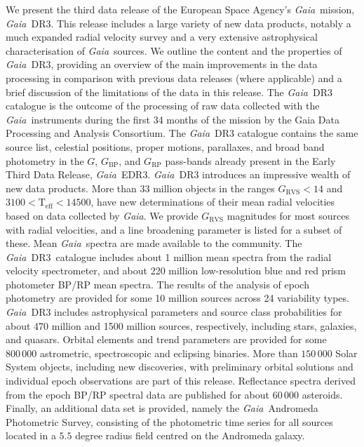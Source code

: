 \documentclass[longauth]{aa}
\providecommand{\teff}{\ensuremath{{\mathrm{T_{eff}}}}\xspace}
\providecommand{\bprp}{BP/RP\xspace}
\providecommand\gmag{\ensuremath{G}\xspace}
\providecommand\gbp{\ensuremath{G_\mathrm{BP}}\xspace}
\providecommand\grp{\ensuremath{G_\mathrm{RP}}\xspace}
\providecommand\grvs{\ensuremath{G_\mathrm{RVS}}\xspace}
\newcommand\gaia{\textit{Gaia}\xspace}
\providecommand\gedrthree{\textit{Gaia}~EDR3\xspace}
\providecommand\gdrthree{\textit{Gaia}~DR3\xspace}
\begin{document}
\date{Received May 3, 2022 ; accepted June 1st, 2022 }

\abstract
{ We present the third data release of the European Space Agency's  \gaia\ mission, \gdrthree. This release includes a large variety of new data products, notably a much expanded radial velocity survey and a very extensive astrophysical characterisation of \gaia\ sources.}
{We  outline the content and the properties of \gdrthree, providing an overview of the main improvements in the data processing in comparison with previous data releases (where applicable) and a brief discussion  of the limitations of the data in this release.}
{The \gdrthree catalogue is the outcome of the processing of raw data collected with the \gaia\ instruments during the first 34 months of the mission by the Gaia Data Processing and Analysis Consortium.}
{The \gdrthree catalogue contains  the same source list, celestial positions,  proper motions, parallaxes, and  broad band photometry in the \gmag, \gbp,  and \grp pass-bands already present in the Early Third Data Release, \gedrthree. \gdrthree introduces an impressive wealth of new data products. More than 33 million objects in the ranges $\grvs < 14$ and  $3100 <\teff <14500 $, have new determinations of their mean radial velocities based on data collected by \gaia. We provide \grvs magnitudes for most sources with radial velocities, and  a line broadening parameter is listed for a subset of these. Mean \gaia\ spectra are made available to the community. The \gdrthree\ catalogue includes about 1 million mean spectra from the radial velocity spectrometer, and about 220 million low-resolution blue and red prism photometer \bprp mean spectra. The results of the analysis of epoch photometry are provided for some 10 million sources across 24 variability types. \gdrthree includes astrophysical parameters and source class probabilities for about 470 million and 1500 million sources, respectively, including stars, galaxies, and quasars. Orbital elements and trend parameters are provided for some $800\,000$ astrometric, spectroscopic and eclipsing binaries. More than $150\,000$  Solar System objects, including new discoveries, with preliminary orbital solutions and individual epoch observations are part of this release. Reflectance spectra derived from the epoch  \bprp spectral data are published for about 60\,000 asteroids. Finally, an additional data set is provided, namely the \gaia\ Andromeda Photometric Survey, consisting of the photometric time series for all sources located in a $5.5$ degree radius field centred on the Andromeda galaxy.}
\end{document}

